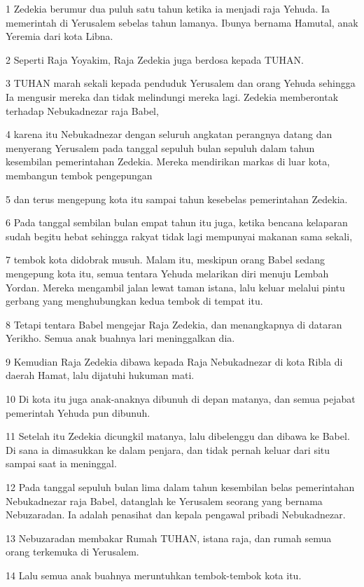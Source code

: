 \par 1 Zedekia berumur dua puluh satu tahun ketika ia menjadi raja Yehuda. Ia memerintah di Yerusalem sebelas tahun lamanya. Ibunya bernama Hamutal, anak Yeremia dari kota Libna.
\par 2 Seperti Raja Yoyakim, Raja Zedekia juga berdosa kepada TUHAN.
\par 3 TUHAN marah sekali kepada penduduk Yerusalem dan orang Yehuda sehingga Ia mengusir mereka dan tidak melindungi mereka lagi. Zedekia memberontak terhadap Nebukadnezar raja Babel,
\par 4 karena itu Nebukadnezar dengan seluruh angkatan perangnya datang dan menyerang Yerusalem pada tanggal sepuluh bulan sepuluh dalam tahun kesembilan pemerintahan Zedekia. Mereka mendirikan markas di luar kota, membangun tembok pengepungan
\par 5 dan terus mengepung kota itu sampai tahun kesebelas pemerintahan Zedekia.
\par 6 Pada tanggal sembilan bulan empat tahun itu juga, ketika bencana kelaparan sudah begitu hebat sehingga rakyat tidak lagi mempunyai makanan sama sekali,
\par 7 tembok kota didobrak musuh. Malam itu, meskipun orang Babel sedang mengepung kota itu, semua tentara Yehuda melarikan diri menuju Lembah Yordan. Mereka mengambil jalan lewat taman istana, lalu keluar melalui pintu gerbang yang menghubungkan kedua tembok di tempat itu.
\par 8 Tetapi tentara Babel mengejar Raja Zedekia, dan menangkapnya di dataran Yerikho. Semua anak buahnya lari meninggalkan dia.
\par 9 Kemudian Raja Zedekia dibawa kepada Raja Nebukadnezar di kota Ribla di daerah Hamat, lalu dijatuhi hukuman mati.
\par 10 Di kota itu juga anak-anaknya dibunuh di depan matanya, dan semua pejabat pemerintah Yehuda pun dibunuh.
\par 11 Setelah itu Zedekia dicungkil matanya, lalu dibelenggu dan dibawa ke Babel. Di sana ia dimasukkan ke dalam penjara, dan tidak pernah keluar dari situ sampai saat ia meninggal.
\par 12 Pada tanggal sepuluh bulan lima dalam tahun kesembilan belas pemerintahan Nebukadnezar raja Babel, datanglah ke Yerusalem seorang yang bernama Nebuzaradan. Ia adalah penasihat dan kepala pengawal pribadi Nebukadnezar.
\par 13 Nebuzaradan membakar Rumah TUHAN, istana raja, dan rumah semua orang terkemuka di Yerusalem.
\par 14 Lalu semua anak buahnya meruntuhkan tembok-tembok kota itu.
